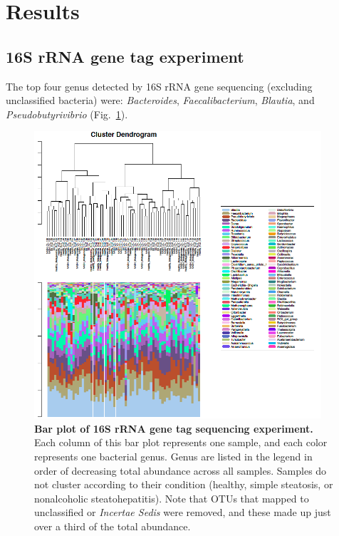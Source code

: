 \FloatBarrier

\section{Results}

\subsection{16S rRNA gene tag experiment}
The top four genus detected by 16S rRNA gene sequencing (excluding unclassified bacteria) were: \textit{Bacteroides}, \textit{Faecalibacterium}, \textit{Blautia}, and \textit{Pseudobutyrivibrio} (Fig.~\ref{nafld_16s_barplot}).

\begin{figure}[h]
\begin{center}
\includegraphics[width=0.95\textwidth]{16s_genus_barplot.png}
\caption[Bar plot of 16S rRNA gene tag sequencing experiment.]{\textbf{Bar plot of 16S rRNA gene tag sequencing experiment.} Each column of this bar plot represents one sample, and each color represents one bacterial genus. Genus are listed in the legend in order of decreasing total abundance across all samples. Samples do not cluster according to their condition (healthy, simple steatosis, or nonalcoholic steatohepatitis). Note that OTUs that mapped to unclassified or \textit{Incertae Sedis} were removed, and these made up just over a third of the total abundance.}
\end{center}
\label{nafld_16s_barplot}
\end{figure}

